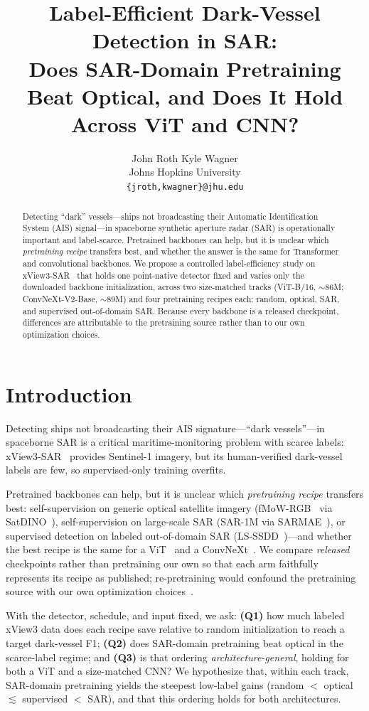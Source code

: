 \documentclass[10pt,twocolumn,letterpaper]{article}
\title{Label-Efficient Dark-Vessel Detection in SAR:\\
Does SAR-Domain Pretraining Beat Optical, and Does It Hold Across ViT and CNN?}
\author{John Roth \qquad Kyle Wagner\\
Johns Hopkins University\\
{\tt\small \{jroth,kwagner\}@jhu.edu}
}
\begin{document}
\maketitle

\begin{abstract}
Detecting ``dark'' vessels---ships not broadcasting their Automatic
Identification System (AIS) signal---in spaceborne synthetic aperture radar
(SAR) is operationally important and label-scarce. Pretrained backbones can
help, but it is unclear which \emph{pretraining recipe} transfers best, and
whether the answer is the same for Transformer and convolutional backbones. We
propose a controlled label-efficiency study on
xView3-SAR~\cite{paolo2022xview3} that holds one point-native detector fixed and
varies only the downloaded backbone initialization, across two size-matched
tracks (ViT-B/16, $\sim$86M; ConvNeXt-V2-Base, $\sim$89M) and four pretraining
recipes each: random, optical, SAR, and supervised out-of-domain SAR. Because
every backbone is a released checkpoint, differences are attributable to the
pretraining source rather than to our own optimization choices.
\end{abstract}

\section{Introduction}
\label{sec:intro}
Detecting ships not broadcasting their AIS signature---``dark vessels''---in
spaceborne SAR is a critical maritime-monitoring problem with scarce labels:
xView3-SAR~\cite{paolo2022xview3} provides Sentinel-1 imagery, but its
human-verified dark-vessel labels are few, so supervised-only training overfits.

Pretrained backbones can help, but it is unclear which \emph{pretraining recipe}
transfers best: self-supervision on generic optical satellite imagery
(fMoW-RGB~\cite{christie2018fmow} via SatDINO~\cite{straka2025satdino}),
self-supervision on large-scale SAR (SAR-1M via SARMAE~\cite{liu2026sarmae}), or
supervised detection on labeled out-of-domain SAR
(LS-SSDD~\cite{zhang2020lsssdd})---and whether the best recipe is the same for a
ViT~\cite{dosovitskiy2021image} and a ConvNeXt~\cite{woo2023convnextv2}. We
compare \emph{released} checkpoints rather than pretraining our own so that each
arm faithfully represents its recipe as published; re-pretraining would confound
the pretraining source with our own optimization
choices~\cite{zoph2020rethinking}.

With the detector, schedule, and input fixed, we ask:
\textbf{(Q1)} how much labeled xView3 data does each recipe save relative to
random initialization to reach a target dark-vessel F1;
\textbf{(Q2)} does SAR-domain pretraining beat optical in the scarce-label
regime; and \textbf{(Q3)} is that ordering \emph{architecture-general}, holding
for both a ViT and a size-matched CNN? We hypothesize that, within each track,
SAR-domain pretraining yields the steepest low-label gains
(random $<$ optical $\lesssim$ supervised $<$ SAR), and that this ordering holds
for both architectures.
\end{document}

